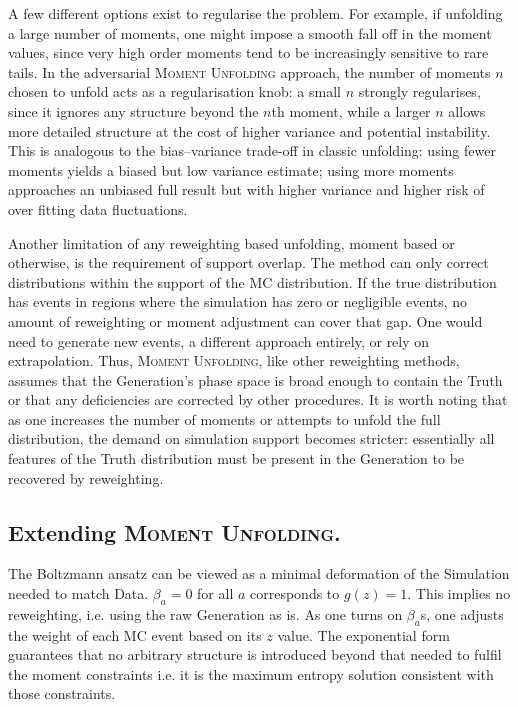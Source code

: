{{        A few different options exist to regularise the problem.
        For example, if unfolding a large number of moments, one might impose a smooth fall off in the moment values, since very high order moments tend to be increasingly sensitive to rare tails.
        In the adversarial \textsc{Moment Unfolding} approach, the number of moments $n$ chosen to unfold acts as a regularisation knob: a small $n$ strongly regularises, since it ignores any structure beyond the $n$th moment, while a larger $n$ allows more detailed structure at the cost of higher variance and potential instability.
        This is analogous to the bias--variance trade-off in classic unfolding: using fewer moments yields a biased but low variance estimate; using more moments approaches an unbiased full result but with higher variance and higher risk of over fitting data fluctuations.
        
        Another limitation of any reweighting based unfolding, moment based or otherwise, is the requirement of support overlap.
        The method can only correct distributions within the support of the MC distribution.
        If the true distribution has events in regions where the simulation has zero or negligible events, no amount of reweighting or moment adjustment can cover that gap.
        One would need to generate new events, a different approach entirely, or rely on extrapolation.
        Thus, \textsc{Moment Unfolding}, like other reweighting methods, assumes that the Generation's phase space is broad enough to contain the Truth or that any deficiencies are corrected by other procedures.
        It is worth noting that as one increases the number of moments or attempts to unfold the full distribution, the demand on simulation support becomes stricter: essentially all features of the Truth distribution must be present in the Generation to be recovered by reweighting.
        
    \subsection{Extending \textsc{Moment Unfolding}.}
        The Boltzmann ansatz can be viewed as a minimal deformation of the Simulation needed to match Data.
        $\beta_a = 0$ for all $a$ corresponds to $g(z)=1$.
        This implies no reweighting, i.e. using the raw Generation as is.
         As one turns on $\beta_a$s, one adjusts the weight of each MC event based on its $z$ value.
        The exponential form guarantees that no arbitrary structure is introduced beyond that needed to fulfil the moment constraints i.e. it is the maximum entropy solution consistent with those constraints.
        
}}
